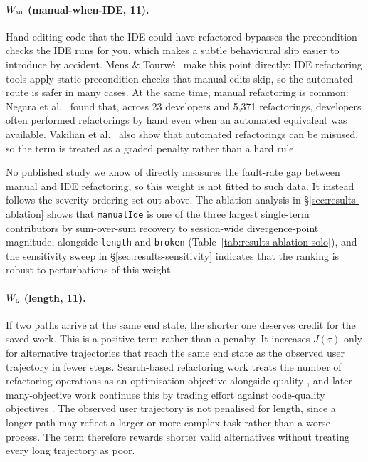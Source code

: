 \paragraph{$W_{\textsc{mi}}$ (manual-when-IDE, 11).}
Hand-editing code that the IDE could have refactored bypasses the precondition checks the IDE runs for you, which makes a subtle behavioural slip easier to introduce by accident. Mens \& Tourw{\'e}~\cite{mens2004survey} make this point directly: IDE refactoring tools apply static precondition checks that manual edits skip, so the automated route is safer in many cases. At the same time, manual refactoring is common: Negara et al.~\cite{negara2013manualautomated} found that, across 23 developers and 5,371 refactorings, developers often performed refactorings by hand even when an automated equivalent was available. Vakilian et al.~\cite{vakilian2012usedisuse} also show that automated refactorings can be misused, so the term is treated as a graded penalty rather than a hard rule.

No published study we know of directly measures the fault-rate gap between manual and IDE refactoring, so this weight is not fitted to such data. It instead follows the severity ordering set out above. The ablation analysis in \S\ref{sec:results-ablation} shows that \texttt{manualIde} is one of the three largest single-term contributors by sum-over-sum recovery to session-wide divergence-point magnitude, alongside \texttt{length} and \texttt{broken} (Table~\ref{tab:results-ablation-solo}), and the sensitivity sweep in \S\ref{sec:results-sensitivity} indicates that the ranking is robust to perturbations of this weight.

\paragraph{$W_{\textsc{l}}$ (length, 11).}
If two paths arrive at the same end state, the shorter one deserves credit for the saved work. This is a positive term rather than a penalty. It increases $J(\tau)$ only for alternative trajectories that reach the same end state as the observed user trajectory in fewer steps. Search-based refactoring work treats the number of refactoring operations as an optimisation objective alongside quality \cite{harman2007pareto,mohan2019manyobjective}, and later many-objective work continues this by trading effort against code-quality objectives \cite{cortellessa2023manyobjective}. The observed user trajectory is not penalised for length, since a longer path may reflect a larger or more complex task rather than a worse process. The term therefore rewards shorter valid alternatives without treating every long trajectory as poor.

